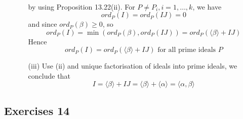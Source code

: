 \begin{enumerate}
\begin{enumerate}
\begin{eqnarray*}
    \end{eqnarray*}
    by using Proposition 13.22(ii). For $P \neq P_i,i=1,\ldots,k$, we have
    $$ord_{P}(I)=ord_{P}(IJ)=0$$
    and since $ord_{P}(\beta) \ge 0$, so
    $$ord_{P}(I)=\min{(ord_{P}(\beta),ord_{P}(IJ))}=ord_{P}(\langle \beta \rangle +IJ)$$
    Hence $$ord_{P}(I)=ord_{P}(\langle \beta \rangle +IJ) \text{ for all prime ideals } P$$
    \item[(iii)] Use (ii) and unique factorisation of ideals into prime ideals, we conclude that
    $$I=\langle \beta \rangle +IJ=\langle \beta \rangle +\langle \alpha \rangle =\langle \alpha,\beta \rangle$$
    \end{enumerate}
\end{enumerate}

\subsection{Exercises 14}

